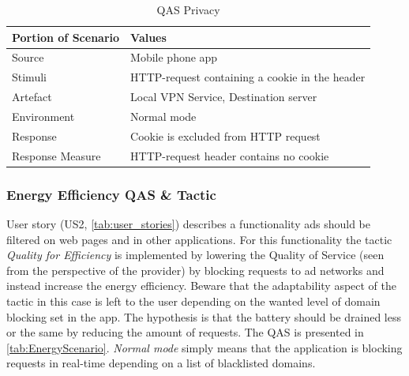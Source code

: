 \documentclass[main.tex]{subfiles}
\begin{document}
\begin{table}[H]
    \centering
    \begin{tabular}{|p{5cm}|p{8cm}|} \hline
        \textbf{Portion of Scenario}& \textbf{Values}   \\ \hline
        Source                      & Mobile phone app  \\ \hline
        Stimuli                     & HTTP-request containing a cookie in the header    \\ \hline
        Artefact                    & Local VPN Service, Destination server  \\ \hline
        Environment                 & Normal mode       \\ \hline
        Response                    & Cookie is excluded from HTTP request  \\ \hline
        Response Measure            & HTTP-request header contains no cookie\\ \hline
    \end{tabular}
    \caption{QAS Privacy}
    \label{tab:PrivSce}
\end{table}


\subsubsection{Energy Efficiency QAS \& Tactic}
\label{subsec:EnergyEfficiencyTacticandScenario}
User story (US2, \autoref{tab:user_stories}) describes a functionality ads should be filtered on web pages and in other applications. For this functionality the tactic \textit{Quality for Efficiency}\cite{Kjaergaard2015OnSensing} is implemented by lowering the Quality of Service (seen from the perspective of the provider) by blocking requests to ad networks and instead increase the energy efficiency. Beware that the adaptability aspect of the tactic in this case is left to the user depending on the wanted level of domain blocking set in the app. The hypothesis is that the battery should be drained less or the same by reducing the amount of requests. The QAS is presented in \autoref{tab:EnergyScenario}. \textit{Normal mode} simply means that the application is blocking requests in real-time depending on a list of blacklisted domains.
\end{document}
